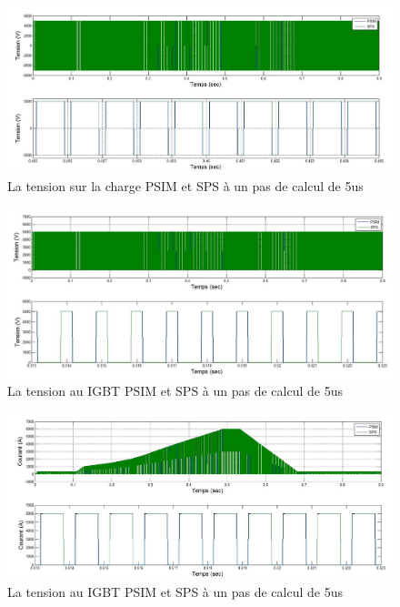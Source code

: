 \documentclass[11pt,letterpaper,final]{report}
\begin{document}
\begin{figure}[h!]
\centering
\includegraphics[scale=0.5]{Fig/Hacheur4Quadrants/HacheurTensionCharge5u.jpg}
\caption{La tension sur la charge PSIM et SPS à un pas de calcul de 5us}
\label{hc_ten_ch_5}
\end{figure}


\begin{figure}[h!]
\centering
\includegraphics[scale=0.5]{Fig/Hacheur4Quadrants/HacheurTensionIGBT5u.jpg}
\caption{La tension au IGBT PSIM et SPS à un pas de calcul de 5us}
\label{hc_IG_ten_5}
\end{figure}

\begin{figure}[h!]
\centering
\includegraphics[scale=0.5]{Fig/Hacheur4Quadrants/HacheurCourantIGBT5u.jpg}
\caption{La tension au IGBT PSIM et SPS à un pas de calcul de 5us}
\label{hc_IG_cou_5}
\end{figure}
\clearpage
\end{document}

